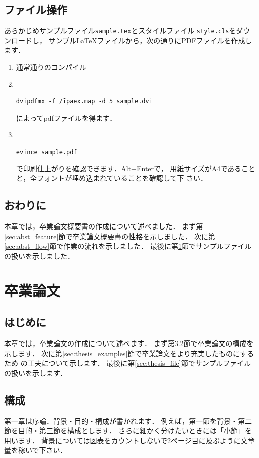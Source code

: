 \documentclass[a4j,12pt,dvipdfmx,oneside]{jsbook}
\theoremstyle{definition}
\begin{document}
\section{ファイル操作}\label{sec:abst_file}
%
%
%
あらかじめサンプルファイル\texttt{sample.tex}とスタイルファイル
\texttt{style.cls}をダウンロードし，
サンプル\LaTeX{}ファイルから，次の通りにPDFファイルを作成します．
\begin{enumerate}
\item 通常通りのコンパイル
\item {　}
\begin{center}
\texttt{dvipdfmx -f \~/ipaex.map -d 5 sample.dvi}
\end{center}
によってpdfファイルを得ます．
\item {　}
\begin{center}
\texttt{evince sample.pdf}
\end{center}
で印刷仕上がりを確認できます．Alt+Enterで，
用紙サイズがA4であることと，全フォントが埋め込まれていることを確認して下
      さい．
\end{enumerate}
%
%
%
\section{おわりに}\label{sec:abst_summary}
本章では，卒業論文概要書の作成について述べました．
まず第\ref{sec:abst_feature}節で卒業論文概要書の性格を示しました．
次に第\ref{sec:abst_flow}節で作業の流れを示しました．
最後に第\ref{sec:abst_file}節でサンプルファイルの扱いを示しました．
%
%
%
\chapter{卒業論文}\label{chap:thesis}
%
%
%
\section{はじめに}\label{sec:thesis_intro}
本章では，卒業論文の作成について述べます．
まず第\ref{sec:thesis_contents}節で卒業論文の構成を示します．
次に第\ref{sec:thesis_examples}節で卒業論文をより充実したものにするため
の工夫について示します．
最後に第\ref{sec:thesis_file}節でサンプルファイルの扱いを示します．
%
%
%
\section{構成}\label{sec:thesis_contents}
第一章は序論．背景・目的・構成が書かれます．
例えば，第一節を背景・第二節を目的・第三節を構成とします．
さらに細かく分けたいときには「小節」を用います．
背景については図表をカウントしないで2ページ目に及ぶように文章量を稼いで下さい．
\end{document}
